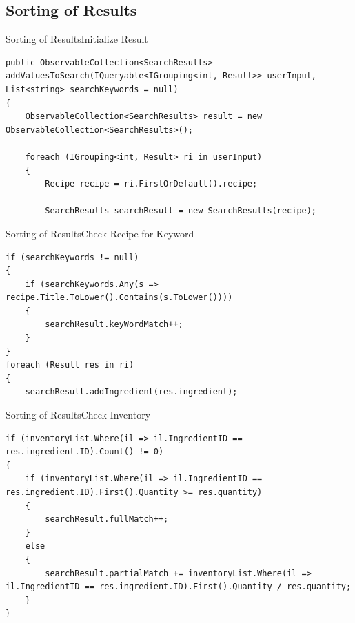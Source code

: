 
\subsection{Sorting of Results}
\begin{frame}[fragile]{Sorting of Results}{Initialize Result}
\begin{lstlisting}
public ObservableCollection<SearchResults> addValuesToSearch(IQueryable<IGrouping<int, Result>> userInput, List<string> searchKeywords = null)
{
    ObservableCollection<SearchResults> result = new ObservableCollection<SearchResults>();

    foreach (IGrouping<int, Result> ri in userInput)
    {
        Recipe recipe = ri.FirstOrDefault().recipe;

        SearchResults searchResult = new SearchResults(recipe);
\end{lstlisting}
\end{frame}

\begin{frame}[fragile]{Sorting of Results}{Check Recipe for Keyword}
\begin{lstlisting}
if (searchKeywords != null)
{
    if (searchKeywords.Any(s => recipe.Title.ToLower().Contains(s.ToLower())))
    {
        searchResult.keyWordMatch++;
    }
}
foreach (Result res in ri)
{
    searchResult.addIngredient(res.ingredient);
\end{lstlisting}
\end{frame}

\begin{frame}[fragile]{Sorting of Results}{Check Inventory}
\begin{lstlisting}
if (inventoryList.Where(il => il.IngredientID == res.ingredient.ID).Count() != 0)
{
    if (inventoryList.Where(il => il.IngredientID == res.ingredient.ID).First().Quantity >= res.quantity)
    {
        searchResult.fullMatch++;
    }
    else
    {
        searchResult.partialMatch += inventoryList.Where(il => il.IngredientID == res.ingredient.ID).First().Quantity / res.quantity;
    }
}
\end{lstlisting}
\end{frame}

